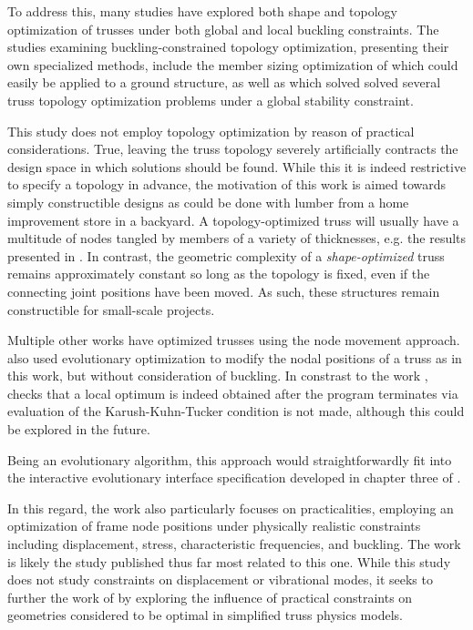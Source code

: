 \documentclass{report}
\begin{document}
To address this, many studies have explored both shape and topology optimization
of trusses under both global and local buckling constraints.
The studies examining buckling-constrained topology optimization, presenting their
own specialized methods, include the member sizing optimization of \cite{ben-talOptimalDesignTrusses2000}
which could easily be applied to a ground structure, as well as \cite{kocvaraModellingSolvingTruss2002}
which solved solved several truss topology optimization problems under a
global stability constraint.

This study does not employ topology optimization by reason of practical considerations.
True, leaving the truss topology severely artificially contracts the design space in which solutions should be found.
While this it is indeed restrictive to specify a topology in advance, the motivation
of this work is aimed towards simply constructible designs as could be done with
lumber from a home improvement store in a backyard. A topology-optimized truss
will usually have a multitude of nodes tangled by members of a variety of thicknesses,
e.g. the results presented in \cite{bendsoeTopologyDesignTruss2004}. In contrast, the geometric complexity
of a \textit{shape-optimized} truss remains approximately constant so long as the topology is
fixed, even if the connecting joint positions have been moved. As such, these structures
remain constructible for small-scale projects.

Multiple other works have optimized trusses using the node movement approach.
\cite{wangTrussShapeOptimization2002} also used evolutionary optimization to modify the
nodal positions of a truss as in this work, but without consideration of buckling.
In constrast to the work \cite{wangTrussShapeOptimization2002}, checks that a local
optimum is indeed obtained after the program terminates via evaluation of the Karush-Kuhn-Tucker condition
is not made, although this could be explored in the future.

Being an evolutionary algorithm, this approach would straightforwardly fit into
the interactive evolutionary interface specification developed in chapter three of \cite{muellerComputationalExplorationStructural2014}.

In this regard, the work \cite{pedersenOptimizationPracticalTrusses2003} also particularly focuses
on practicalities, employing an optimization of frame node positions under physically realistic
constraints including  displacement, stress, characteristic frequencies, and buckling.
The work \cite{pedersenOptimizationPracticalTrusses2003} is likely the study published
thus far most related to this one. While this study does not study constraints on displacement
or vibrational modes, it seeks to further the work of \cite{pedersenOptimizationPracticalTrusses2003}
by exploring the influence of practical constraints on geometries considered to be optimal
in simplified truss physics models.
\end{document}
